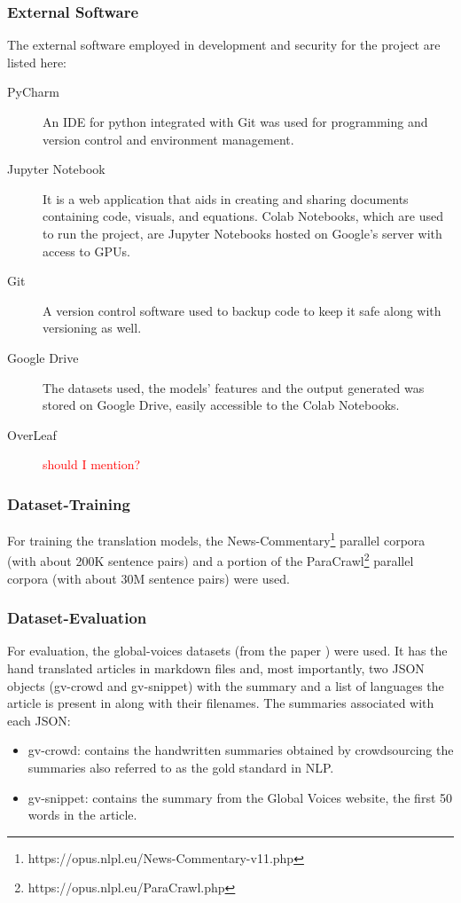 \documentclass[12pt,a4paper,twoside,openright]{report}
\newcommand{\red}[1]{\textcolor{red}{#1}}
\begin{document}
\subsubsection{External Software}
The external software employed in development and security for the project are listed here:
\begin{description}
\item[PyCharm]
An IDE for python integrated with Git was used for programming and version control and environment management.

\item[Jupyter Notebook]
It is a web application that aids in creating and sharing documents containing code, visuals, and equations. Colab Notebooks, which are used to run the project, are Jupyter Notebooks hosted on Google's server with access to GPUs.

\item[Git]
A version control software used to backup code to keep it safe along with versioning as well.

\item[Google Drive]
The datasets used, the models' features and the output generated was stored on Google Drive, easily accessible to the Colab Notebooks.

\item[OverLeaf]
\red{should I mention?}

\end{description}


\subsubsection{Dataset-Training}
For training the translation models, the News-Commentary\footnote{https://opus.nlpl.eu/News-Commentary-v11.php} parallel corpora (with about 200K sentence pairs) and a portion of the ParaCrawl\footnote{https://opus.nlpl.eu/ParaCrawl.php} parallel corpora (with about 30M sentence pairs) were used.

\subsubsection{Dataset-Evaluation}
For evaluation, the global-voices datasets (from the paper \cite{nguyen-daume-iii-2019-global}) were used. It has the hand translated articles in markdown files and, most importantly, two JSON objects (gv-crowd and gv-snippet) with the summary and a list of languages the article is present in along with their filenames. The summaries associated with each JSON: \begin{itemize}
    \item gv-crowd: contains the handwritten summaries obtained by crowdsourcing the summaries also referred to as the gold standard in NLP.
    \item gv-snippet: contains the summary from the Global Voices website, the first 50 words in the article.
\end{itemize}
\end{document}
